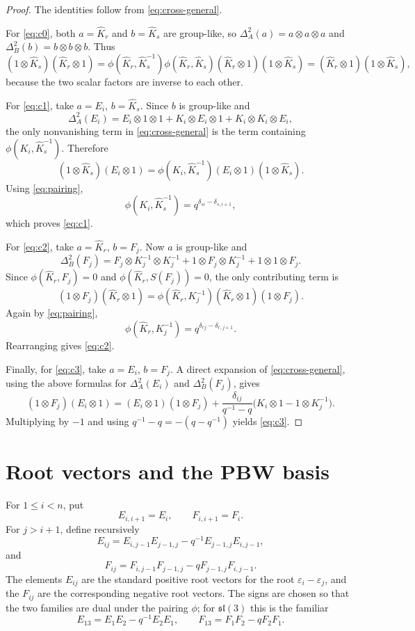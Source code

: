 \documentclass[11pt]{article}
\theoremstyle{definition}
\newcommand{\slie}{\mathfrak{sl}}
\newcommand{\KK}{\hat K}
\newcommand{\eps}{\varepsilon}
\begin{document}
\begin{proof}
The identities follow from \eqref{eq:cross-general}.

For \eqref{eq:c0}, both $a=\KK_r$ and $b=\KK_s$ are group-like, so
$\Delta_A^2(a)=a\otimes a\otimes a$ and
$\Delta_B^2(b)=b\otimes b\otimes b$. Thus
\[
(1\otimes \KK_s)(\KK_r\otimes 1)
=
\phi(\KK_r,\KK_s^{-1})\phi(\KK_r,\KK_s)
(\KK_r\otimes 1)(1\otimes \KK_s)
=
(\KK_r\otimes 1)(1\otimes \KK_s),
\]
because the two scalar factors are inverse to each other.

For \eqref{eq:c1}, take $a=E_i$, $b=\KK_s$. Since $b$ is group-like and
\[
\Delta_A^2(E_i)
=
E_i\otimes 1\otimes 1
+
K_i\otimes E_i\otimes 1
+
K_i\otimes K_i\otimes E_i,
\]
the only nonvanishing term in \eqref{eq:cross-general} is the term containing
$\phi(K_i,\KK_s^{-1})$. Therefore
\[
(1\otimes \KK_s)(E_i\otimes 1)
=
\phi(K_i,\KK_s^{-1})(E_i\otimes 1)(1\otimes \KK_s).
\]
Using \eqref{eq:pairing},
\[
\phi(K_i,\KK_s^{-1})
=
q^{\delta_{si}-\delta_{s,i+1}},
\]
which proves \eqref{eq:c1}.

For \eqref{eq:c2}, take $a=\KK_r$, $b=F_j$. Now $a$ is group-like and
\[
\Delta_B^2(F_j)
=
F_j\otimes K_j^{-1}\otimes K_j^{-1}
+
1\otimes F_j\otimes K_j^{-1}
+
1\otimes 1\otimes F_j.
\]
Since $\phi(\KK_r,F_j)=0$ and $\phi(\KK_r,S(F_j))=0$, the only contributing term is
\[
(1\otimes F_j)(\KK_r\otimes 1)
=
\phi(\KK_r,K_j^{-1})(\KK_r\otimes 1)(1\otimes F_j).
\]
Again by \eqref{eq:pairing},
\[
\phi(\KK_r,K_j^{-1})=q^{\delta_{rj}-\delta_{r,j+1}}.
\]
Rearranging gives \eqref{eq:c2}.

Finally, for \eqref{eq:c3}, take $a=E_i$, $b=F_j$. A direct expansion of
\eqref{eq:cross-general}, using the above formulas for $\Delta_A^2(E_i)$ and
$\Delta_B^2(F_j)$, gives
\[
(1\otimes F_j)(E_i\otimes 1)
=
(E_i\otimes 1)(1\otimes F_j)
+
\frac{\delta_{ij}}{q^{-1}-q}
\bigl(K_i\otimes 1-1\otimes K_j^{-1}\bigr).
\]
Multiplying by $-1$ and using $q^{-1}-q=-(q-q^{-1})$ yields \eqref{eq:c3}.
\end{proof}

\section{Root vectors and the PBW basis}

For $1\le i<n$, put
\[
E_{i,i+1}=E_i,\qquad F_{i,i+1}=F_i.
\]
For $j>i+1$, define recursively
\begin{equation}
\label{eq:upper-root}
E_{ij}=E_{i,j-1}E_{j-1,j}-q^{-1}E_{j-1,j}E_{i,j-1},
\end{equation}
and
\begin{equation}
\label{eq:lower-root}
F_{ij}=F_{i,j-1}F_{j-1,j}-q F_{j-1,j}F_{i,j-1}.
\end{equation}
The elements $E_{ij}$ are the standard positive root vectors for the root
$\eps_i-\eps_j$, and the $F_{ij}$ are the corresponding negative root vectors.
The signs are chosen so that the two families are dual under the pairing $\phi$;
for $\slie(3)$ this is the familiar
\[
E_{13}=E_1E_2-q^{-1}E_2E_1,\qquad
F_{13}=F_1F_2-qF_2F_1.
\]
\end{document}
